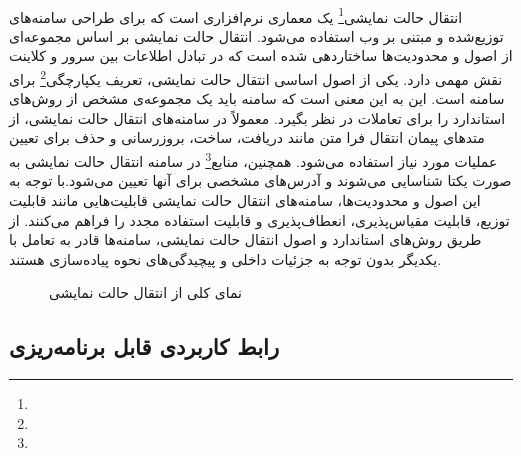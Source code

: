 \paragraph{}
{
    انتقال حالت نمایشی\footnote{} یک معماری نرم‌افزاری است که برای طراحی سامنه‌های توزیع‌شده و مبتنی بر وب استفاده می‌شود. انتقال حالت نمایشی بر اساس مجموعه‌ای از اصول و محدودیت‌ها ساختاردهی شده است که در تبادل اطلاعات بین سرور و کلاینت نقش مهمی دارد. یکی از اصول اساسی انتقال حالت نمایشی، تعریف یکپارچگی\footnote{} برای سامنه است. این به این معنی است که سامنه باید یک مجموعه‌ی مشخص از روش‌های استاندارد را برای تعاملات در نظر بگیرد. معمولاً در سامنه‌های انتقال حالت نمایشی، از متدهای پیمان انتقال فرا متن مانند دریافت، ساخت، بروزرسانی و حذف برای تعیین عملیات مورد نیاز استفاده می‌شود. همچنین، منابع\footnote{} در سامنه انتقال حالت نمایشی به صورت یکتا شناسایی می‌شوند و آدرس‌های مشخصی برای آنها تعیین می‌شود.با توجه به این اصول و محدودیت‌ها، سامنه‌های انتقال حالت نمایشی قابلیت‌هایی مانند قابلیت توزیع، قابلیت مقیاس‌پذیری، انعطاف‌پذیری و قابلیت استفاده مجدد را فراهم می‌کنند. از طریق روش‌های استاندارد و اصول انتقال حالت نمایشی، سامنه‌ها قادر به تعامل با یکدیگر بدون توجه به جزئیات داخلی و پیچیدگی‌های نحوه پیاده‌سازی هستند.   
    \begin{figure}[H]
        \caption{نمای کلی از انتقال حالت نمایشی}
        \label{fig:rest}
    \end{figure}
}

\subsection{رابط کاربردی قابل برنامه‌ریزی}
\label{subsecsec:api}
